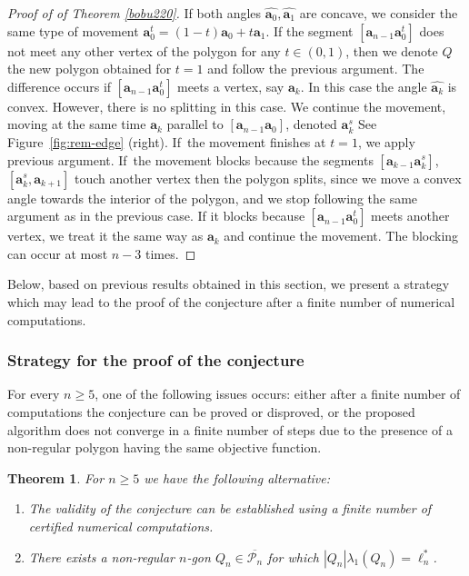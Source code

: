 \documentclass[JEP,XML,SOM,Unicode,ThmDefs,NoFloatCountersInSection,published]{cedram}
\newenvironment{enumeratea}
{\bgroup\def\theenumi{\alph{enumi}}\begin{enumerate}}
{\end{enumerate}\egroup}
\theoremstyle{plain}
\newtheorem{thm}{Theorem}[section]
\theoremstyle{definition}
\newcommand{\bo}[1]{{\boldsymbol#1}}
\begin{document}
\begin{proof}[Proof of of Theorem \ref{bobu220}]
If both angles $\widehat{\bo a_0}, \widehat{\bo a_1}$ are concave, we consider the same type of movement $\bo a_0^t= (1-t) \bo a_0+t\bo a_1$. If the segment $[\bo a_{n-1}\bo a_0^t]$ does not meet any other vertex of the polygon for any $t\in(0,1)$, then we denote $Q$ the new polygon obtained for $t=1$ and follow the previous argument. The difference occurs if $[\bo a_{n-1}\bo a_0^t]$ meets a vertex, say $\bo a_k$. In this case the angle $\widehat{\bo a_k}$ is convex. However, there is no splitting in this case. We continue the movement, moving at the same time $\bo a_k$ {parallel to $[\bo a_{n-1}\bo a_0]$, denoted $\bo a_k^s$ See Figure~\ref{fig:rem-edge} (right)}.
If~the movement finishes at $t=1$, we apply previous argument. If~the movement blocks because the {segments $[\bo a_{k-1}\bo a_k^s]$, $[\bo a_k^s, \bo a_{k+1}]$ touch another vertex} then the polygon {splits, since we move a convex angle towards the interior of the polygon, and we stop following the same argument as in the previous case}. If it blocks because $[\bo a_{n-1}\bo a_0^t]$ meets another vertex, we treat it the same way as $\bo a_k$ and continue the movement. The blocking can occur at most $n-3$ times.
\end{proof}

Below, based on previous results obtained in this section, we present a strategy which may lead to the proof of the conjecture after a finite number of numerical computations.

\subsubsection*{Strategy for the proof of the conjecture}
For every $n \ge 5$, one of the following issues occurs: either after a finite number of computations the conjecture can be proved or disproved, or the proposed algorithm does not converge in a finite number of steps due to the presence of a non-regular polygon having the same objective function.

\begin{thm}\label{thm:numerical-proof}
For $n \geq 5$ we have the following alternative:
\begin{enumeratea}
\item\label{thm:numerical-proofa}
The validity of the conjecture can be established using a finite number of certified numerical computations.

\item\label{thm:numerical-proofb}
There exists a non-regular $n$-gon $Q_n \in \overline{\mathcal P_n}$ for which $|Q_n|\lambda_1(Q_n) = \ell_n^*$.
\end{enumeratea}
\end{thm}
\end{document}
